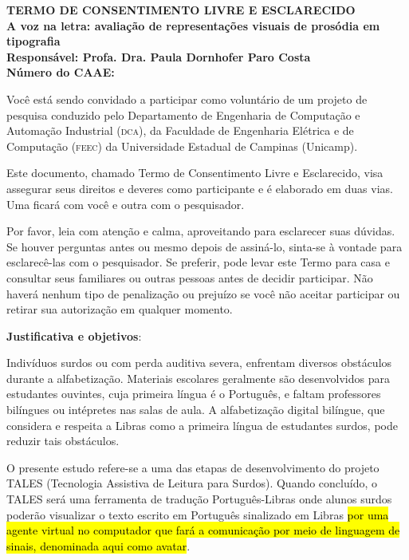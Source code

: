 \documentclass[a4paper, 12pt]{article}
\begin{document}


	\begin{center}
		\textbf{\large{TERMO DE CONSENTIMENTO LIVRE E ESCLARECIDO}}\\
        \vspace{10pt}
        \textbf{\Large{A voz na letra: avaliação de representações visuais de prosódia em tipografia}}\\
        \vspace{10pt}
        \textbf{Responsável: Profa. Dra. Paula Dornhofer Paro Costa}\\
        \vspace{10pt}
        \textbf{Número do CAAE: }\\
        \vspace{15pt}
	\end{center}

\noindent Você está sendo convidado a participar como voluntário de um projeto de pesquisa conduzido pelo Departamento de Engenharia de Computação e Automação Industrial (\textsc{dca}), da Faculdade de Engenharia Elétrica e de Computação (\textsc{feec}) da Universidade Estadual de Campinas (Unicamp).

Este documento, chamado Termo de Consentimento Livre e Esclarecido, visa assegurar seus direitos e deveres como participante e é elaborado em duas vias. Uma ficará com você e outra com o pesquisador.

Por favor, leia com atenção e calma, aproveitando para esclarecer suas dúvidas. Se houver perguntas antes ou mesmo depois de assiná-lo, sinta-se à vontade para esclarecê-las com o pesquisador. Se preferir, pode levar este Termo para casa e consultar seus familiares ou outras pessoas antes de decidir participar. Não haverá nenhum tipo de penalização ou prejuízo se você não aceitar participar ou retirar sua
autorização em qualquer momento.

\vspace{10pt}
\textbf{Justificativa e objetivos}:

Indivíduos surdos ou com perda auditiva severa, enfrentam diversos obstáculos durante a alfabetização. Materiais escolares geralmente são desenvolvidos para estudantes ouvintes, cuja primeira língua é o Português, e faltam professores bilíngues ou intépretes nas salas de aula. A alfabetização digital bilíngue, que considera e respeita a Libras como a primeira língua de estudantes surdos, pode reduzir tais obstáculos.

O presente estudo refere-se a uma das etapas de desenvolvimento do projeto TALES (Tecnologia Assistiva de Leitura para Surdos). Quando concluído, o TALES será uma ferramenta de tradução Português-Libras onde alunos surdos poderão visualizar o texto escrito em Português sinalizado em Libras \hl{por uma agente virtual no computador que fará a comunicação por meio de linguagem de sinais, denominada aqui como avatar}.
\end{document}
